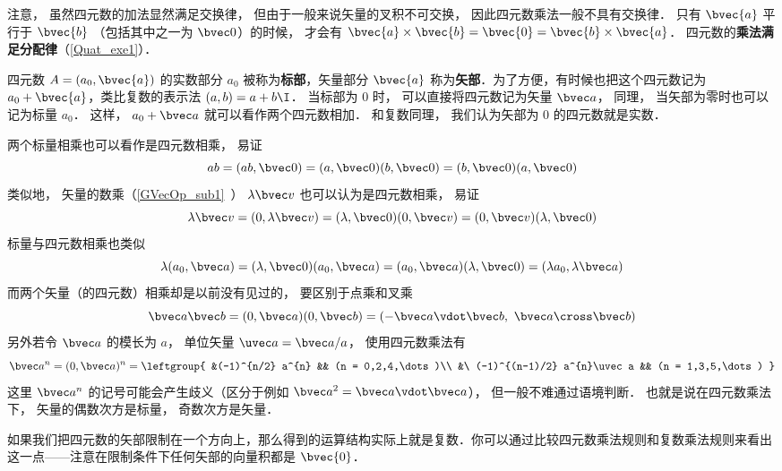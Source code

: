 注意， 虽然四元数的加法显然满足交换律， 但由于一般来说矢量的叉积不可交换， 因此四元数乘法一般不具有交换律． 只有 $\bvec{a}$ 平行于 $\bvec{b}$ （包括其中之一为 $\bvec 0$）的时候， 才会有 $\bvec{a}\times\bvec{b}= \bvec{0} =\bvec{b}\times\bvec{a}$． 四元数的\textbf{乘法满足分配律}（\autoref{Quat_exe1}）．

四元数 $A=(a_0, \bvec{a})$ 的实数部分 $a_0$ 被称为\textbf{标部}，矢量部分 $\bvec{a}$ 称为\textbf{矢部}．为了方便，有时候也把这个四元数记为 $a_0+\bvec{a}$，类比复数的表示法 $(a, b)=a+b\I$． 当标部为 $0$ 时， 可以直接将四元数记为矢量 $\bvec a$， 同理， 当矢部为零时也可以记为标量 $a_0$． 这样， $a_0 + \bvec a$ 就可以看作两个四元数相加． 和复数同理， 我们认为矢部为 $0$ 的四元数就是实数．

\begin{example}{}
两个标量相乘也可以看作是四元数相乘， 易证
\begin{equation}
ab = (ab, \bvec 0) = (a,\bvec 0)(b,\bvec 0) = (b,\bvec 0)(a,\bvec 0)
\end{equation}
类似地， 矢量的数乘（\autoref{GVecOp_sub1}~） $\lambda\bvec v$ 也可以认为是四元数相乘， 易证
\begin{equation}
\lambda\bvec v = (0, \lambda\bvec v) = (\lambda, \bvec 0)(0, \bvec v) = (0, \bvec v)(\lambda, \bvec 0)
\end{equation}
标量与四元数相乘也类似
\begin{equation}
\lambda (a_0, \bvec a) = (\lambda,\bvec 0) (a_0, \bvec a) = (a_0, \bvec a)(\lambda,\bvec 0) = (\lambda a_0, \lambda\bvec a)
\end{equation}
而两个矢量（的四元数）相乘却是以前没有见过的， 要区别于点乘和叉乘
\begin{equation}
\bvec a\bvec b = (0, \bvec a)(0, \bvec b) = (-\bvec a\vdot\bvec b,\ \bvec a\cross\bvec b)
\end{equation}
另外若令 $\bvec a$ 的模长为 $a$， 单位矢量 $\uvec a = \bvec a/a$， 使用四元数乘法有
\begin{equation}
\bvec a^{n} = (0, \bvec a)^{n} =
\leftgroup{
&(-1)^{n/2} a^{n} && (n = 0,2,4,\dots)\\
&\ (-1)^{(n-1)/2} a^{n}\uvec a && (n = 1,3,5,\dots)
}
\end{equation}
这里 $\bvec a^{n}$ 的记号可能会产生歧义（区分于例如 $\bvec a^2 = \bvec a\vdot\bvec a$）， 但一般不难通过语境判断． 也就是说在四元数乘法下， 矢量的偶数次方是标量， 奇数次方是矢量．
\end{example}

如果我们把四元数的矢部限制在一个方向上，那么得到的运算结构实际上就是复数．你可以通过比较四元数乘法规则和复数乘法规则来看出这一点——注意在限制条件下任何矢部的向量积都是 $\bvec{0}$．

